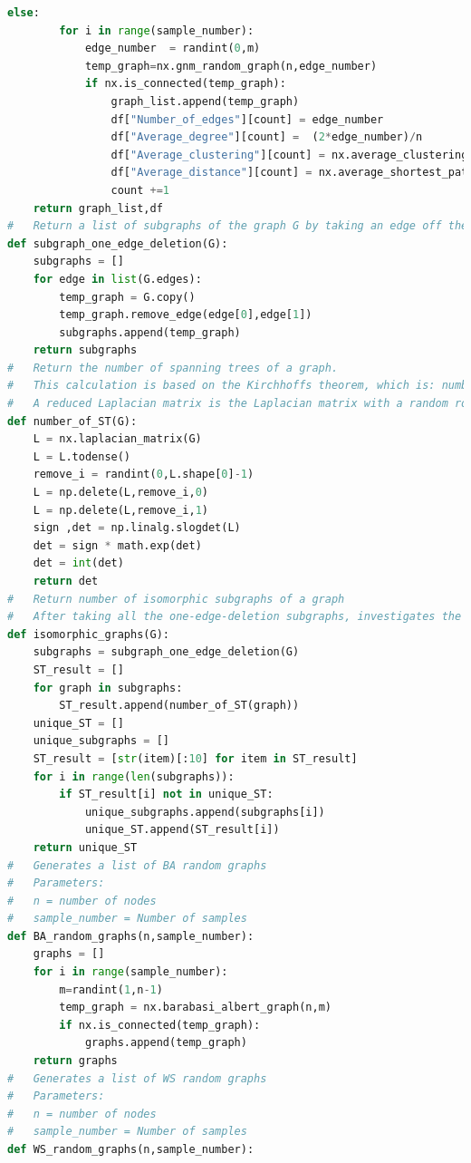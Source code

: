 \documentclass[12pt]{article}
\begin{document}
\begin{lstlisting}[language=Python,breaklines=true]
    else:
        for i in range(sample_number):
            edge_number  = randint(0,m)
            temp_graph=nx.gnm_random_graph(n,edge_number)
            if nx.is_connected(temp_graph):
                graph_list.append(temp_graph)
                df["Number_of_edges"][count] = edge_number
                df["Average_degree"][count] =  (2*edge_number)/n
                df["Average_clustering"][count] = nx.average_clustering(temp_graph)
                df["Average_distance"][count] = nx.average_shortest_path_length(temp_graph)
                count +=1
    return graph_list,df
#   Return a list of subgraphs of the graph G by taking an edge off the graph
def subgraph_one_edge_deletion(G):
    subgraphs = []
    for edge in list(G.edges):
        temp_graph = G.copy()
        temp_graph.remove_edge(edge[0],edge[1])
        subgraphs.append(temp_graph)
    return subgraphs
#   Return the number of spanning trees of a graph.
#   This calculation is based on the Kirchhoffs theorem, which is: number of ST = det(reduced Laplacian matrix)
#   A reduced Laplacian matrix is the Laplacian matrix with a random row i and column i to be removed
def number_of_ST(G):
    L = nx.laplacian_matrix(G)
    L = L.todense()
    remove_i = randint(0,L.shape[0]-1)
    L = np.delete(L,remove_i,0)
    L = np.delete(L,remove_i,1)
    sign ,det = np.linalg.slogdet(L)
    det = sign * math.exp(det)
    det = int(det)
    return det
#   Return number of isomorphic subgraphs of a graph
#   After taking all the one-edge-deletion subgraphs, investigates the number of different ST will remove isomorphic subgraphs
def isomorphic_graphs(G):
    subgraphs = subgraph_one_edge_deletion(G)
    ST_result = []
    for graph in subgraphs:
        ST_result.append(number_of_ST(graph))
    unique_ST = []
    unique_subgraphs = []
    ST_result = [str(item)[:10] for item in ST_result]
    for i in range(len(subgraphs)):
        if ST_result[i] not in unique_ST:
            unique_subgraphs.append(subgraphs[i])
            unique_ST.append(ST_result[i])
    return unique_ST
#   Generates a list of BA random graphs
#   Parameters:
#   n = number of nodes
#   sample_number = Number of samples
def BA_random_graphs(n,sample_number):
    graphs = []
    for i in range(sample_number):
        m=randint(1,n-1)
        temp_graph = nx.barabasi_albert_graph(n,m)
        if nx.is_connected(temp_graph):
            graphs.append(temp_graph)
    return graphs
#   Generates a list of WS random graphs
#   Parameters:
#   n = number of nodes
#   sample_number = Number of samples
def WS_random_graphs(n,sample_number):

\end{lstlisting}
\end{document}
